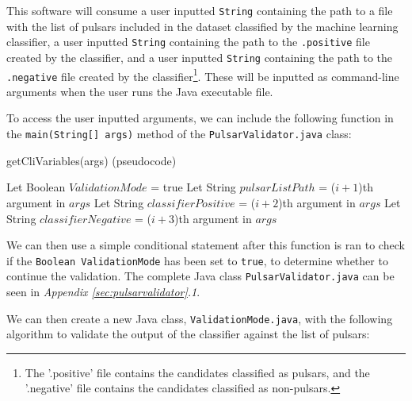\documentclass{article}
\begin{document}
This software will consume a user inputted \verb|String| containing the path to a file with the list of pulsars included in the dataset classified by the machine learning classifier, a user inputted \verb|String| containing the path to the \verb|.positive| file created by the classifier, and a user inputted \verb|String| containing the path to the \verb|.negative| file created by the classifier\footnote{The '.positive' file contains the candidates classified as pulsars, and the '.negative' file contains the candidates classified as non-pulsars.}. These will be inputted as command-line arguments when the user runs the Java executable file.

To access the user inputted arguments, we can include the following function in the \verb|main(String[] args)| method of the \verb|PulsarValidator.java| class:

\begin{algorithm}[H]
    \caption{getCliVariables(args) (pseudocode)}
    \begin{algorithmic}
                \State Let Boolean $ValidationMode$ = true
                \State Let String $pulsarListPath$ = ($i+1$)th argument in $args$
                \State Let String $classifierPositive$ = ($i+2$)th argument in $args$
                \State Let String $classifierNegative$ = ($i+3$)th argument in $args$
            \EndIf
        \EndFor
    \end{algorithmic}
\end{algorithm}

We can then use a simple conditional statement after this function is ran to check if the \verb|Boolean ValidationMode| has been set to \verb|true|, to determine whether to continue the validation. The complete Java class \verb|PulsarValidator.java| can be seen in \emph{Appendix \ref{sec:pulsarvalidator}.1}.

We can then create a new Java class, \verb|ValidationMode.java|, with the following algorithm to validate the output of the classifier against the list of pulsars:
\end{document}

